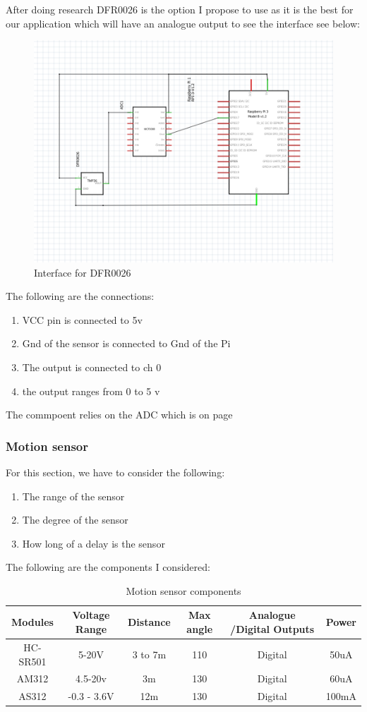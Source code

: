 \newpage
After doing research DFR0026 \cite{DFR0026} is the option I propose to use as it is the best for our application  which will have an analogue  output to see the interface see below:

\begin{figure}[h!]
	\centering
	\includegraphics[width=0.5\linewidth]{Images/InterfaceofDFR0026.png}
	\caption{Interface for  DFR0026}
	\label{Interface for  DFR0026}
\end{figure}

The following are  the connections:
\begin{enumerate}
	\item VCC pin is connected  to 5v
	\item Gnd of the  sensor is connected to Gnd of the Pi
	\item The output is connected to  ch 0
	\item the output ranges  from  0 to  5 v
\end{enumerate}
The commpoent relies on the  ADC  which  is on page\pageref{Adc section}
\subsubsection{Motion sensor}

For this section, we have  to consider the following:
\begin{enumerate}
	\item The range of the  sensor
	\item The degree of the  sensor
	\item How long of a  delay is the sensor
\end{enumerate}
The  following are  the components I considered:
\begin{table}[h!]
	\centering
	\begin{tabular}{|c|c|c|c|c|c|}
		\hline
		Modules & Voltage Range & Distance & Max angle & Analogue /Digital Outputs & Power \\
		\hline
		HC-SR501 & 5-20V & 3 to 7m & 110 & Digital & 50uA \\
		AM312 & 4.5-20v & 3m & 130 & Digital & 60uA \\
		AS312 & -0.3 - 3.6V & 12m & 130 & Digital & 100mA \\
		\hline
	\end{tabular}
	\caption{Motion sensor components}
	\label{Motion sensor components}
\end{table}

